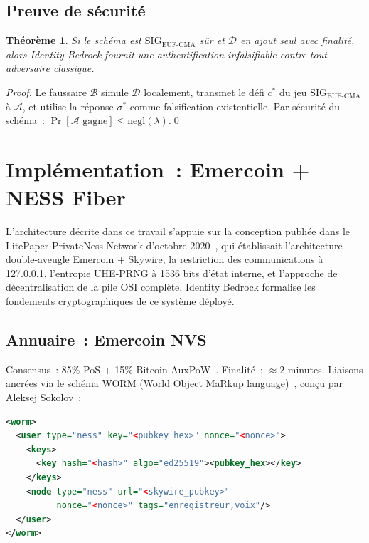 \documentclass[11pt,a4paper]{article}
\newtheorem{theorem}{Théorème}[section]
\theoremstyle{definition}
\newcommand{\SIG}{\mathrm{SIG}}
\newcommand{\EUFCMA}{\mathrm{EUF\text{-}CMA}}
\newcommand{\negl}{\mathrm{negl}}
\newcommand{\BD}{\textsf{Identity Bedrock}}
\begin{document}
\subsection{Preuve de sécurité}

\begin{theorem}
\label{thm:unforgeability}
Si le schéma est $\SIG_{\EUFCMA}$ sûr et $\mathcal{D}$ en ajout seul
avec finalité, alors \BD{} fournit une authentification infalsifiable
contre tout adversaire classique.
\end{theorem}

\begin{proof}
Le faussaire $\mathcal{B}$ simule $\mathcal{D}$ localement, transmet
le défi $c^*$ du jeu $\SIG_{\EUFCMA}$ à $\mathcal{A}$, et utilise
la réponse $\sigma^*$ comme falsification existentielle. Par sécurité
du schéma~: $\Pr[\mathcal{A}\text{ gagne}] \leq \negl(\lambda)$.\hfill\qed
\end{proof}

\section{Implémentation~: Emercoin + NESS Fiber}
\label{sec:implementation}

L'architecture décrite dans ce travail s'appuie sur la conception
publiée dans le LitePaper PrivateNess Network d'octobre
2020~\cite{Litepaper20}, qui établissait l'architecture double-aveugle
Emercoin + Skywire, la restriction des communications à 127.0.0.1,
l'entropie UHE-PRNG à 1536 bits d'état interne, et l'approche de
décentralisation de la pile OSI complète. Identity Bedrock formalise
les fondements cryptographiques de ce système déployé.

\subsection{Annuaire~: Emercoin NVS}

Consensus~: 85\% PoS + 15\% Bitcoin AuxPoW~\cite{Emercoin}.
Finalité~: $\approx$2 minutes. Liaisons ancrées via le schéma WORM
(World Object MaRkup language)~\cite{WORM}, conçu par Aleksej
Sokolov~:

\begin{lstlisting}[language=XML]
<worm>
  <user type="ness" key="<pubkey_hex>" nonce="<nonce>">
    <keys>
      <key hash="<hash>" algo="ed25519"><pubkey_hex></key>
    </keys>
    <node type="ness" url="<skywire_pubkey>"
          nonce="<nonce>" tags="enregistreur,voix"/>
  </user>
</worm>
\end{lstlisting}
\end{document}
